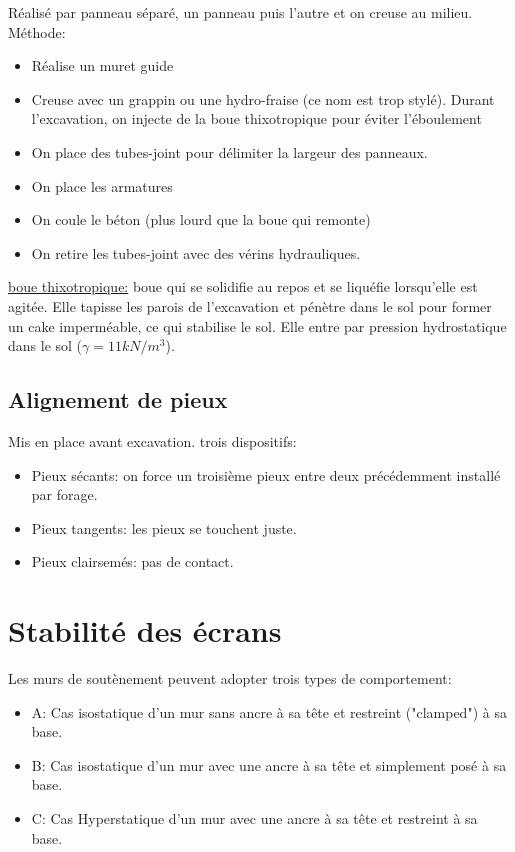 Réalisé par panneau séparé, un panneau puis l'autre et on creuse au milieu.
Méthode:
\begin{itemize}
    \item Réalise un muret guide
    \item Creuse avec un grappin ou une hydro-fraise (ce nom est trop stylé). Durant l'excavation, on injecte de la boue thixotropique pour éviter l'éboulement
    \item On place des tubes-joint pour délimiter la largeur des panneaux.
    \item On place les armatures
    \item On coule le béton (plus lourd que la boue qui remonte)
    \item On retire les tubes-joint avec des vérins hydrauliques.
\end{itemize}

\medskip

\underline{boue thixotropique:} boue qui se solidifie au repos et se liquéfie lorsqu'elle est agitée. Elle tapisse les parois de l'excavation et pénètre dans le sol pour former un cake imperméable, ce qui stabilise le sol. Elle entre par pression hydrostatique dans le sol ($\gamma = 11 kN/m^3$).

\subsection{Alignement de pieux}

Mis en place avant excavation. trois dispositifs: 
\begin{itemize}
    \item Pieux sécants: on force un troisième pieux entre deux précédemment installé par forage.
    \item Pieux tangents: les pieux se touchent juste.
    \item Pieux clairsemés: pas de contact.
\end{itemize}

\section{Stabilité des écrans}

Les murs de soutènement peuvent adopter trois types de comportement:
\begin{itemize}
    \item A: Cas isostatique d'un mur sans ancre à sa tête et restreint ("clamped") à sa base.
    \item B: Cas isostatique d'un mur avec une ancre à sa tête et simplement posé à sa base.
    \item C: Cas Hyperstatique d'un mur avec une ancre à sa tête et restreint à sa base.
\end{itemize} 

